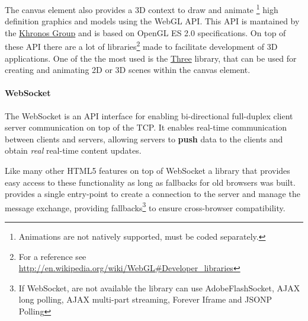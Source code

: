 The canvas element also provides a 3D context to draw and animate
\footnote{Animations are not natively supported, must be coded separately.}
high definition graphics and models using the WebGL API. This API is mantained
by the \href{http://www.khronos.org/}{Khronos Group} and is based on OpenGL ES
2.0 specifications. On top of these API there are a lot of libraries\footnote{For
a reference see \url{http://en.wikipedia.org/wiki/WebGL\#Developer_libraries}}
made to facilitate development of 3D applications. One of the the most used is
the \href{http://mrdoob.github.com/three.js/}{Three} \js{} library, that can be
used for creating and animating 2D or 3D scenes within the canvas element.








\paragraph{WebSocket}
The WebSocket is an API interface for enabling bi-directional full-duplex client
server communication on top of the \ac{TCP}. It enables real-time
communication between clients and servers, allowing servers to \textbf{push} data
to the clients and obtain \emph{real} real-time content updates.

Like many other \ac{HTML}5 features on top of WebSocket a library that
provides easy access to these functionality as long as fallbacks for old browsers
was built.
 provides a single entry-point to create a connection to the
server and manage the message exchange, providing fallbacks\footnote{If WebSocket,
are not available the library can use Adobe\reg Flash\reg Socket, AJAX long
polling, AJAX multi-part streaming, Forever Iframe and JSONP Polling} to ensure
cross-browser compatibility.






